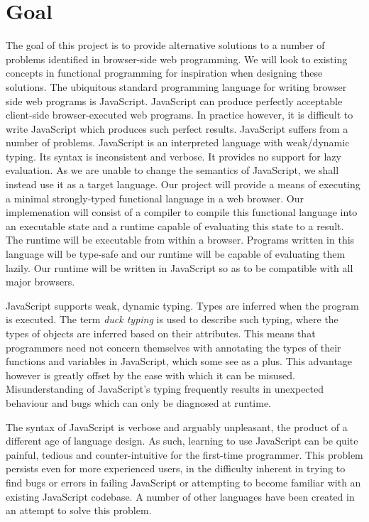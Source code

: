 
\section*{Goal}
The goal of this project is to provide alternative solutions to a number of problems
identified in browser-side web programming. We will look to existing concepts in 
functional programming for inspiration when designing these solutions. The ubiquitous 
standard programming language for writing browser side web programs is JavaScript. 
JavaScript can produce 
perfectly acceptable client-side browser-executed web programs. In practice however, 
it is difficult to write JavaScript which produces such perfect results. JavaScript 
suffers from a number of problems. JavaScript is an
interpreted language with weak/dynamic typing. Its syntax is inconsistent and verbose.
It provides no support for lazy evaluation. As we are unable to change the semantics
of JavaScript, we shall instead use it as a target language. Our project will 
provide a means of executing a minimal strongly-typed functional language in a web
browser. Our implemenation will consist of a compiler to 
compile this functional language into an executable state and a runtime capable of 
evaluating this state to a result. The runtime will be executable from within a browser.
Programs written in this language will be type-safe and our runtime will be capable
of evaluating them lazily. Our runtime will be written in JavaScript so as to be 
compatible with all major browsers.

JavaScript supports weak, dynamic typing. Types are inferred when the program is
executed. The term \emph{duck typing} is used to describe such typing, where the types
of objects are inferred based on their attributes. This means that programmers need
not concern themselves with annotating the types of their functions and variables in
JavaScript, which some see as a plus. This advantage however is greatly offset by
the ease with which it can be misused. Misunderstanding of JavaScript's typing 
frequently results in unexpected behaviour and bugs which can only be diagnosed at
runtime. 

The syntax of JavaScript is verbose and arguably unpleasant, the product of a different
age of language design. As such, learning to use JavaScript can be quite painful, tedious
and counter-intuitive for the first-time programmer. This problem persists even for
more experienced users, in the difficulty inherent in trying to find bugs or errors in
failing JavaScript or attempting to become familiar with an existing JavaScript codebase.
A number of other languages have been created in an attempt to solve this problem.

